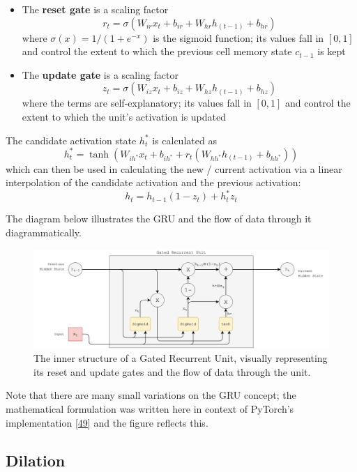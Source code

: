 \documentclass[12pt,]{article}
\providecommand{\tightlist}{%
  \setlength{\itemsep}{0pt}\setlength{\parskip}{0pt}}
\begin{document}
\begin{itemize}
\tightlist
\item
  The \textbf{reset gate} is a scaling factor
  \[r_t = \sigma(W_{ir} x_t + b_{ir} + W_{hr} h_{(t-1)} + b_{hr})\]
  where \(\sigma(x) = 1 / (1 + e^{-x})\) is the sigmoid function; its
  values fall in \([0,1]\) and control the extent to which the previous
  cell memory state \(c_{t-1}\) is kept
\item
  The \textbf{update gate} is a scaling factor
  \[z_t = \sigma(W_{iz} x_t + b_{iz} + W_{hz} h_{(t-1)} + b_{hz})\]
  where the terms are self-explanatory; its values fall in \([0,1]\) and
  control the extent to which the unit's activation is updated
\end{itemize}

The candidate activation state \(h_t^*\) is calculated as
\[h_t^* = \tanh(W_{ih^*} x_t + b_{ih^*} + r_t (W_{hh^*} h_{(t-1)} + b_{hh^*}))\]
which can then be used in calculating the new / current activation via a
linear interpolation of the candidate activation and the previous
activation: \[h_t = h_{t-1} (1 - z_t) + h_t^* z_t\]

The diagram below illustrates the GRU and the flow of data through it
diagrammatically.

\begin{figure}
\centering
\includegraphics{Images/gru.png}
\caption{The inner structure of a Gated Recurrent Unit, visually
representing its reset and update gates and the flow of data through the
unit.}
\end{figure}

Note that there are many small variations on the GRU concept; the
mathematical formulation was written here in context of PyTorch's
implementation {[}\protect\hyperlink{ref-pytorchgru}{49}{]} and the
figure reflects this.

\hypertarget{dilation}{%
\subsection{Dilation}\label{dilation}}
\end{document}
